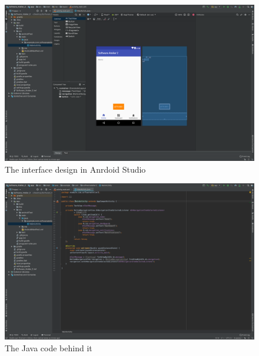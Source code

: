 \documentclass[12pt]{scrartcl}
\begin{document}
	\begin{figure}[H]
        		\centering
       		\includegraphics[width=\textwidth]{../images/androidStudio1.png}
       		\caption{The interface design in Anrdoid Studio}
        		\label{androirdStudio1}
	\end{figure}
	
	\begin{figure}[H]
        		\centering
       		\includegraphics[width=\textwidth]{../images/androidStudio2.png}
       		\caption{The Java code behind it}
        		\label{androirdStudio2}
	\end{figure}
	
\end{document}
